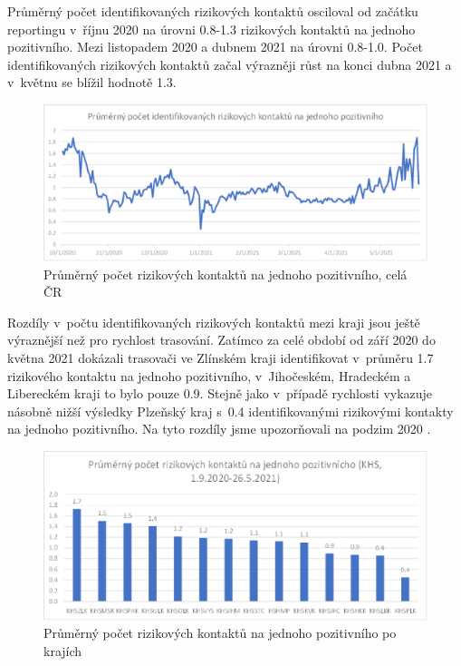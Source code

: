 Průměrný počet identifikovaných rizikových kontaktů osciloval od začátku reportingu v~říjnu 2020 na úrovni 0.8-1.3 rizikových kontaktů na jednoho pozitivního. Mezi listopadem 2020 a dubnem 2021 na úrovni 0.8-1.0. Počet identifikovaných rizikových kontaktů začal výrazněji růst na konci dubna 2021 a v~květnu se blížil hodnotě 1.3.

\begin{figure}[ht]
    \centering
    \includegraphics[width=1\textwidth]{./pic/e.eps}
    \caption{Průměrný počet rizikových kontaktů na jednoho pozitivního, celá ČR}
    \label{fig:rizik1}
\end{figure}

Rozdíly v~počtu identifikovaných rizikových kontaktů mezi kraji jsou ještě výraznější než pro rychlost trasování. Zatímco za celé období od září 2020 do května 2021 dokázali trasovači ve Zlínském kraji identifikovat v~průměru 1.7 rizikového kontaktu na jednoho pozitivního, v~Jihočeském, Hradeckém a Libereckém kraji to bylo pouze 0.9. Stejně jako v~případě rychlosti vykazuje násobně nižší výsledky Plzeňský kraj s~0.4 identifikovanými rizikovými kontakty na jednoho pozitivního. Na tyto rozdíly jsme upozorňovali na podzim 2020 \cite{tr_bisop04}.

\begin{figure}[ht]
    \centering
    \includegraphics[width=1\textwidth]{./pic/f.eps}
    \caption{Průměrný počet rizikových kontaktů na jednoho pozitivního po krajích}
    \label{fig:rizik1kraj}
\end{figure}

